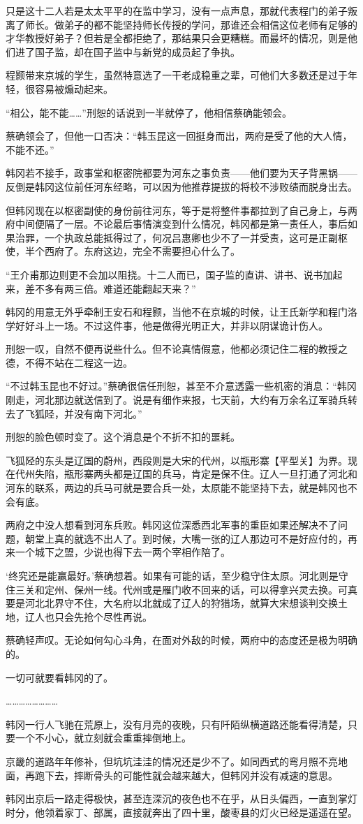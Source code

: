 只是这十二人若是太太平平的在监中学习，没有一点声息，那就代表程门的弟子叛离了师长。做弟子的都不能坚持师长传授的学问，那谁还会相信这位老师有足够的才华教授好弟子？但若是全都拒绝了，那结果只会更糟糕。而最坏的情况，则是他们进了国子监，却在国子监中与新党的成员起了争执。

程颢带来京城的学生，虽然特意选了一干老成稳重之辈，可他们大多数还是过于年轻，很容易被煽动起来。

“相公，能不能……”刑恕的话说到一半就停了，他相信蔡确能领会。

蔡确领会了，但他一口否决：“韩玉昆这一回挺身而出，两府是受了他的大人情，不能不还。”

韩冈若不接手，政事堂和枢密院都要为河东之事负责——他们要为天子背黑锅——反倒是韩冈这位前任河东经略，可以因为他推荐提拔的将校不涉败绩而脱身出去。

但韩冈现在以枢密副使的身份前往河东，等于是将整件事都拉到了自己身上，与两府中间便隔了一层。不论最后事情演变到什么情况，韩冈都是第一责任人，事后如果治罪，一个执政总能抵得过了，何况吕惠卿也少不了一并受责，这可是正副枢使，半个西府了。东府这边，完全不需要担心什么了。

“王介甫那边则更不会加以阻挠。十二人而已，国子监的直讲、讲书、说书加起来，差不多有两三倍。难道还能翻起天来？”

韩冈的用意无外乎牵制王安石和程颢，当他不在京城的时候，让王氏新学和程门洛学好好斗上一场。不过这件事，他是做得光明正大，并非以阴谋诡计伤人。

刑恕一叹，自然不便再说些什么。但不论真情假意，他都必须记住二程的教授之德，不得不站在二程这一边。

“不过韩玉昆也不好过。”蔡确很信任刑恕，甚至不介意透露一些机密的消息：“韩冈刚走，河北那边就送信到了。说是有细作来报，七天前，大约有万余名辽军骑兵转去了飞狐陉，并没有南下河北。”

刑恕的脸色顿时变了。这个消息是个不折不扣的噩耗。

飞狐陉的东头是辽国的蔚州，西段则是大宋的代州，以瓶形寨【平型关】为界。现在代州失陷，瓶形寨两头都是辽国的兵马，肯定是保不住。辽人一旦打通了河北和河东的联系，两边的兵马可就是要合兵一处，太原能不能坚持下去，就是韩冈也不会有底。

两府之中没人想看到河东兵败。韩冈这位深悉西北军事的重臣如果还解决不了问题，朝堂上真的就选不出人了。到时候，大嘴一张的辽人那边可不是好应付的，再来一个城下之盟，少说也得下去一两个宰相作陪了。

‘终究还是能赢最好。’蔡确想着。如果有可能的话，至少稳守住太原。河北则是守住三关和定州、保州一线。代州或是雁门收不回来的话，可以得拿兴灵去换。可真要是河北北界守不住，大名府以北就成了辽人的狩猎场，就算大宋想谈判交换土地，辽人也只会先抢个尽性再说。

蔡确轻声叹。无论如何勾心斗角，在面对外敌的时候，两府中的态度还是极为明确的。

一切可就要看韩冈的了。

……………………

韩冈一行人飞驰在荒原上，没有月亮的夜晚，只有阡陌纵横道路还能看得清楚，只要一个不小心，就立刻就会重重摔倒地上。

京畿的道路年年修补，但坑坑洼洼的情况还是少不了。如同西式的弯月照不亮地面，再跑下去，摔断骨头的可能性就会越来越大，但韩冈并没有减速的意思。

韩冈出京后一路走得极快，甚至连深沉的夜色也不在乎，从日头偏西，一直到掌灯时分，他领着家丁、部属，直接就奔出了四十里，酸枣县的灯火已经是遥遥在望。
